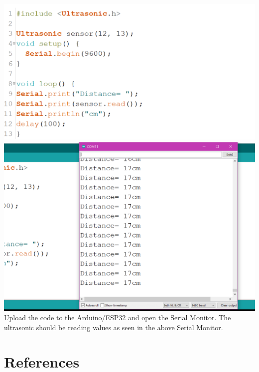 \documentclass[a4paper,12pt]{report}
\newcommand{\diagramWidth}{150mm}
\begin{document}
    \newpage
    \includegraphics[width = \diagramWidth]{Assets/ultrasonic_code.png} \\
    \includegraphics[width = \diagramWidth]{Assets/ultrasonic_monitor.png} \\
    Upload the code to the Arduino/ESP32 and open the Serial Monitor. The ultrasonic should be reading values as seen in the above Serial Monitor.
    
\newpage

\section*{References}


\end{document}
